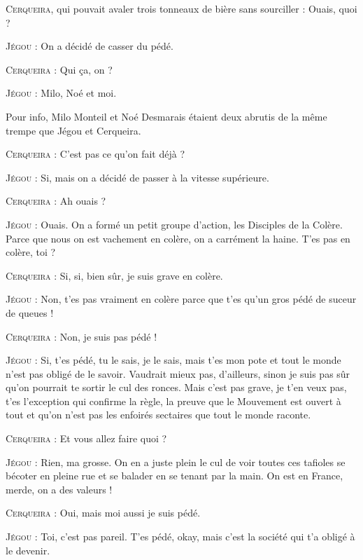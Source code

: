\begin{dialogue}

\textsc{Cerqueira}, qui pouvait avaler trois tonneaux de bière sans sourciller : Ouais, quoi ?

\textsc{Jégou} : On a décidé de casser du pédé.

\textsc{Cerqueira} : Qui ça, on ?

\textsc{Jégou} : Milo, Noé et moi.

\end{dialogue}

Pour info, Milo Monteil et Noé Desmarais étaient deux abrutis de la même trempe que Jégou et Cerqueira.

\begin{dialogue}

\textsc{Cerqueira} : C’est pas ce qu’on fait déjà ?

\textsc{Jégou} : Si, mais on a décidé de passer à la vitesse supérieure.

\textsc{Cerqueira} : Ah ouais ?

\textsc{Jégou} : Ouais. On a formé un petit groupe d’action, les Disciples de la Colère. Parce que nous on est vachement en colère, on a carrément la haine. T’es pas en colère, toi ?

\textsc{Cerqueira} : Si, si, bien sûr, je suis grave en colère.

\textsc{Jégou} : Non, t’es pas vraiment en colère parce que t’es qu’un gros pédé de suceur de queues !

\textsc{Cerqueira} : Non, je suis pas pédé !

\textsc{Jégou} : Si, t’es pédé, tu le sais, je le sais, mais t’es mon pote et tout le monde n’est pas obligé de le savoir. Vaudrait mieux pas, d’ailleurs, sinon je suis pas sûr qu’on pourrait te sortir le cul des ronces. Mais c’est pas grave, je t’en veux pas, t’es l’exception qui confirme la règle, la preuve que le Mouvement est ouvert à tout et qu’on n’est pas les enfoirés sectaires que tout le monde raconte.

\textsc{Cerqueira} : Et vous allez faire quoi ?

\textsc{Jégou} : Rien, ma grosse. On en a juste plein le cul de voir toutes ces tafioles se bécoter en pleine rue et se balader en se tenant par la main. On est en France, merde, on a des valeurs !

\textsc{Cerqueira} : Oui, mais moi aussi je suis pédé.

\textsc{Jégou} : Toi, c’est pas pareil. T’es pédé, okay, mais c’est la société qui t’a obligé à le devenir.


\end{dialogue}

